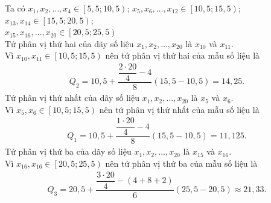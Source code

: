\begin{ex}
{\begin{enumerate}
			Ta có $x_1, x_2, \ldots, x_4 \in \left[5{,}5; 10{,}5\right)$; $x_5, x_6, \ldots, x_{12}  \in \left[10{,}5; 15{,}5\right)$; $x_{13}, x_{14} \in \left[15{,}5; 20{,}5\right)$;\\
			$x_{15}, x_{16}, \ldots, x_{20}  \in \left[20{,}5; 25{,}5\right)$\\
			Tứ phân vị thứ  hai của dãy số liệu $x_1, x_2, \ldots, x_{20}$ là $x_{10}$ và $x_{11}$.\\
			 Vì $x_{10}, x_{11} \in \left[10{,}5; 15{,}5\right)$ nên tứ phân vị thứ hai của mẫu số liệu là
			\begin{align*}
				Q_2=10{,}5+\dfrac{\dfrac{2\cdot20}{4}-4}{8} \left(15{,}5-10{,}5\right)=14{,}25. 
			\end{align*}
			Tứ phân vị thứ nhất của dãy số liệu $x_1, x_2, \ldots, x_{20}$  là $x_5$ và $x_6$.\\
			Vì $x_5, x_6 \in  \left[10{,}5; 15{,}5\right)$ nên tứ phân vị thứ nhất của mẫu số liệu là
			\begin{align*}
				 Q_1=10{,}5+\dfrac{\dfrac{1\cdot20}{4}-4}{8} \left(15{,}5-10{,}5\right)=11{,}125.
			\end{align*}
			Tứ phân vị thứ ba của dãy số liệu  $x_1, x_2, \ldots, x_{20}$ là $x_{15}$ và $x_{16}$.\\
			Vì  $x_{16}, x_{16} \in \left[20{,}5; 25{,}5\right)$ nên tứ phân vị thứ ba của mẫu số liệu là
			\begin{align*}
				Q_3=20{,}5+\dfrac{\dfrac{3\cdot20}{4}-\left(4+8+2\right)}{6}  \left(25{,}5-20{,}5\right)\approx 21{,}33.
			\end{align*}
		\end{enumerate}
	} 
\end{ex}


